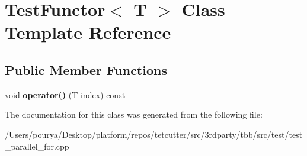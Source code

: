 \hypertarget{classTestFunctor}{}\section{Test\+Functor$<$ T $>$ Class Template Reference}
\label{classTestFunctor}
\subsection*{Public Member Functions}
\begin{DoxyCompactItemize}
\item 
\hypertarget{classTestFunctor_affa125346851e62943aaad30d45306b6}{}void {\bfseries operator()} (T index) const \label{classTestFunctor_affa125346851e62943aaad30d45306b6}

\end{DoxyCompactItemize}


The documentation for this class was generated from the following file\+:\begin{DoxyCompactItemize}
\item 
/\+Users/pourya/\+Desktop/platform/repos/tetcutter/src/3rdparty/tbb/src/test/test\+\_\+parallel\+\_\+for.\+cpp\end{DoxyCompactItemize}
